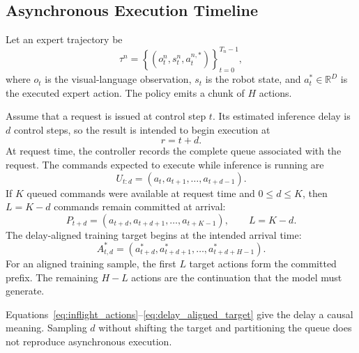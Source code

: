 \subsection{Asynchronous Execution Timeline}

Let an expert trajectory be
\begin{equation}
    \tau^n
    =
    \left\{
        (o_t^n,s_t^n,a_t^{n,*})
    \right\}_{t=0}^{T_n-1},
\end{equation}
where \(o_t\) is the visual-language observation, \(s_t\) is the robot state,
and \(a_t^*\in\mathbb{R}^{D}\) is the executed expert action.  The policy emits
a chunk of \(H\) actions.

Assume that a request is issued at control step \(t\).  Its estimated inference
delay is \(d\) control steps, so the result is intended to begin execution at
\begin{equation}
    r=t+d.
\end{equation}
At request time, the controller records the complete queue associated with the
request.  The commands expected to execute while inference is running are
\begin{equation}
    U_{t:d}
    =
    \left(
        a_t,
        a_{t+1},
        \ldots,
        a_{t+d-1}
    \right).
    \label{eq:inflight_actions}
\end{equation}
If \(K\) queued commands were available at request time and \(0\leq d\leq K\),
then \(L=K-d\) commands remain committed at arrival:
\begin{equation}
    P_{t+d}
    =
    \left(
        a_{t+d},
        a_{t+d+1},
        \ldots,
        a_{t+K-1}
    \right),
    \qquad
    L=K-d.
    \label{eq:committed_prefix}
\end{equation}
The delay-aligned training target begins at the intended arrival time:
\begin{equation}
    A_{t,d}^{*}
    =
    \left(
        a_{t+d}^{*},
        a_{t+d+1}^{*},
        \ldots,
        a_{t+d+H-1}^{*}
    \right).
    \label{eq:delay_aligned_target}
\end{equation}
For an aligned training sample, the first \(L\) target actions form the
committed prefix.  The remaining \(H-L\) actions are the continuation that the
model must generate.

Equations~\eqref{eq:inflight_actions}--\eqref{eq:delay_aligned_target} give the
delay a causal meaning.  Sampling \(d\) without shifting the target and
partitioning the queue does not reproduce asynchronous execution.

